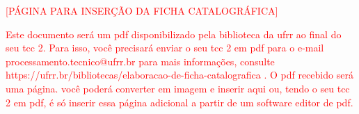 \begin{titlepage}

    \begin{center}
    \textcolor{red}{[PÁGINA PARA INSERÇÃO DA FICHA CATALOGRÁFICA]}

    \textcolor{red}{Este documento será um pdf disponibilizado pela biblioteca da ufrr ao final do seu tcc 2. Para isso, você precisará enviar o seu tcc 2 em pdf para o e-mail processamento.tecnico@ufrr.br para mais informações, consulte  https://ufrr.br/bibliotecas/elaboracao-de-ficha-catalografica . O pdf recebido será uma página. você poderá converter em imagem e inserir aqui ou, tendo o seu tcc 2 em pdf, é só inserir essa página adicional a partir de um software editor de pdf.}
    \end{center}

\end{titlepage}